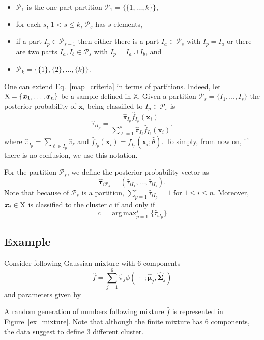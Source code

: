 \documentclass[10pt, a4paper]{article}
\DeclareMathOperator*{\argmax}{arg\,max}
\newcommand{\m}[1]{\boldsymbol{#1}}
\begin{document}
\begin{spacing}{1.9}
\begin{itemize}
\item $\mathcal{P}_1$ is the one-part partition $\mathcal{P}_1 = \{ \{1, \dots, k\} \}$,
\item for each $s$, $1 <  s \leq k$, $\mathcal{P}_{s}$ has $s$ elements,
\item if a part $I_p \in \mathcal{P}_{s-1}$ then either there is a part $I_a \in \mathcal{P}_{s}$ with $I_p = I_a$ or there are two parts $I_a, I_b \in \mathcal{P}_s$ with $I_p = I_a \cup I_b$, and
\item $\mathcal{P}_k= \{ \{1\},\{2\}, \dots, \{k\} \}$.
\end{itemize}



One can extend Eq.~\ref{map_criteria} in terms of partitions. Indeed, let $\rm X = \{\m x_1,\dots, \m x_n\}$ be a sample defined in $\mathbb{X}$. Given a partition $\mathcal{P}_s = \{ I_1, \dots, I_s \}$ the posterior probability of $\m x_i$ being classified to $I_p\in \mathcal{P}_{s}$ is
\[
\hat{\tau}_{i I_p} =  \frac{ \hat{\pi}_{I_p} \hat{f}_{I_p}(\m x_i) }{\sum_{\ell=1}^s \hat{\pi}_{I_\ell} \hat{f}_{I_\ell}(\m x_i)}.
\]
where $\hat{\pi}_{I_p} = \sum_{\ell \in I_p} \hat{\pi}_\ell$ and $\hat{f}_{I_p}(\m x_i) = f_{I_p}(\m x_i; \hat{\theta})$. To simply, from now on, if there is no confusion, we use this notation. 

For the partition  $\mathcal{P}_s$, we define the posterior probability vector as
\[
\hat{\m\tau}_{i \mathcal{P}_s} = \left( \hat{\tau}_{i I_1} , \dots, \hat{\tau}_{i I_s}  \right).
\]
Note that because of $\mathcal{P}_s$ is a partition, $\sum_{p=1}^s \hat{\tau}_{i I_p} = 1$ for $1 \leq i \leq n$.
Moreover, $\m x_i \in \rm X$ is classified to the cluster $c$ if and only if
\begin{equation}\label{cluster_criteria}
c= \argmax_{p=1}^s \{ \hat{\tau}_{i I_p} \}
\end{equation}

\subsection{Example}

Consider following Gaussian mixture with 6 components
\[
\hat{f} = \sum_{j=1}^6 \hat{\pi}_j \phi(\;\cdot\; ; \hat{\m\mu}_j, \hat{\m\Sigma}_j)
\]
and parameters given by
{\small  }


A random generation of numbers following mixture $\hat{f}$ is represented in Figure~\ref{ex_mixture}. Note that although the finite mixture has 6 components, the data suggest to define 3 different cluster.



\end{spacing}
\end{document}
